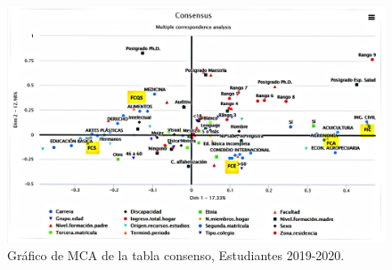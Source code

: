 \documentclass[water,article,submit,moreauthors,pdftex]{mdpi}
\begin{document}
\begin{figure}[!ht]



\begin{center}\includegraphics[width=0.9\linewidth,]{consedu} \end{center}

\caption{Gráfico de MCA de la tabla consenso, Estudiantes 2019-2020.}

\label{fig:CONSedu}
\end{figure}
\end{document}
